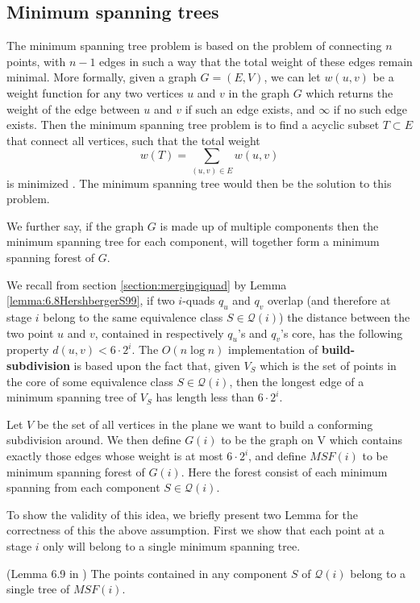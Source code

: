 \subsection{Minimum spanning trees}

The minimum spanning tree problem is based on the problem of connecting $n$ points, with $n - 1$ 
edges in such a way that the total weight of these edges remain minimal. More formally, given a 
graph $G = (E,V)$, we can let $w(u,v)$ be a weight function for any two vertices $u$ and $v$ in the 
graph $G$ which returns the weight of the edge between $u$ and $v$ if such an edge exists, and 
$\infty$ if no such edge exists. Then the minimum spanning tree problem is to find a acyclic subset 
$T \subset E$ that connect all vertices, such that the total weight 
$$ w(T) = \sum_{(u,v) \in E} w(u,v)$$
is minimized \cite{IntroToAlg}. The minimum spanning tree would then be the solution to this problem. 

We further say, if the graph $G$ is made up of multiple components then the minimum spanning tree for 
each component, will together form a minimum spanning forest of $G$.

We recall from section \ref{section:mergingiquad} by Lemma \ref{lemma:6.8HershbergerS99}, if two 
$i$-quads $q_u$ and $q_v$ overlap (and therefore at stage $i$ belong to the same equivalence class $S 
\in \mathcal{Q}(i)$) the distance between the two point $u$ and $v$, contained in respectively $q_u$'s 
and $q_v$'s core, has the following  property $d(u,v) < 6 \cdot 2^i$. The $O(n \log n)$ 
implementation of \textbf{build-subdivision} is based upon the fact that, given $V_S$ which is the 
set of points in the core of some equivalence class $S \in \mathcal{Q}(i)$, then the longest edge of 
a minimum spanning tree of $V_S$ has length less than $6 \cdot 2^i$.

Let $V$ be the set of all vertices in the plane we want to build a conforming subdivision around. We 
then define $G(i)$ to be the graph on V which contains exactly those edges whose weight is at most $6 
\cdot 2^i$, and define $MSF(i)$ to be minimum spanning forest of $G(i)$. Here the forest consist of 
each minimum spanning from each component $S \in \mathcal{Q}(i)$.

To show the validity of this idea, we briefly present two Lemma for the correctness of this the above 
assumption. First we show that each point at a stage $i$ only will belong to a single minimum 
spanning tree.

\begin{Lemma} (Lemma 6.9 in \cite{HershbergerS99}) \label{lemma:6.9HershbergerS99}
The points contained in any component $S$ of $\mathcal{Q}(i)$ belong to a single tree of $MSF(i)$.
\end{Lemma}

